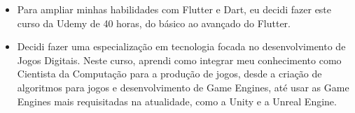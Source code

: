 \begin{itemize}
\item Para ampliar minhas habilidades com Flutter e Dart, eu decidi fazer este curso da Udemy de 40 horas, do básico ao avançado do Flutter.
\end{itemize}
\smallskip
{}
\begin{itemize}
\item Decidi fazer uma especialização em tecnologia focada no desenvolvimento de Jogos Digitais. Neste curso, aprendi como integrar meu conhecimento como Cientista da Computação para a produção de jogos, desde a criação de algoritmos para jogos e desenvolvimento de Game Engines, até usar as Game Engines mais requisitadas na atualidade, como a Unity e a Unreal Engine.
\end{itemize}



\cvproject{}